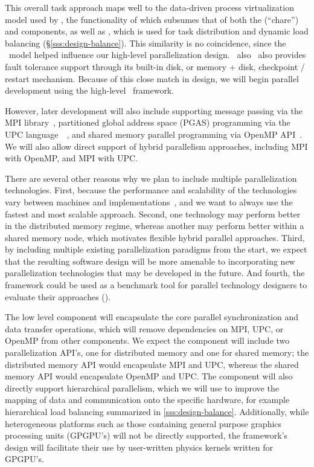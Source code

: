 \documentclass[10pt,twocolumn]{article}
\begin{document}
This overall task approach maps well to the data-driven process
virtualization model used by \charm, the functionality of which
subsumes that of both the  (``chare'') and 
components, as well as , which is used for task
distribution and dynamic load balancing (\S\ref{sss:design-balance}).  This
similarity is no coincidence, since the \charm\ model helped influence
our high-level parallelization design.  \charm\ also \charm\ also
provides fault tolerance support through its built-in disk, or memory
+ disk, checkpoint / restart mechanism.  Because of this close match
in design, we will begin parallel development using the high-level
\charm\ framework.

However, later development will also include supporting message
passing via the MPI library~\cite{wwwmpi}, partitioned global address
space (PGAS) programming via the UPC
language~\cite{wwwupc}~\cite{upc}, and shared memory parallel
programming via OpenMP API~\cite{wwwopenmp}.  We will also allow
direct support of hybrid parallelism approaches, including MPI with
OpenMP, and MPI with UPC.

There are several other reasons why we plan to include multiple
parallelization technologies.  First, because the performance and
scalability of the technologies vary between machines and
implementations~\cite{MaTa09}, and we want to always use the fastest
and most scalable approach.  Second, one technology may perform better
in the distributed memory regime, whereas another may perform better
within a shared memory node, which motivates flexible hybrid parallel
approaches.  Third, by including multiple existing parallelization
paradigms from the start, we expect that the resulting software design
will be more amenable to incorporating new parallelization
technologies that may be developed in the future.  And fourth, the
framework could be used as a benchmark tool for parallel technology
designers to evaluate their approaches (\cite{WeSu07}).

The low level  component will encapsulate the core
parallel synchronization and data transfer operations, which will
remove dependencies on MPI, UPC, or OpenMP from other components.  We
expect the  component will include two parallelization
API's, one for distributed memory and one for shared memory; the
distributed memory API would encapsulate MPI and UPC, whereas the
shared memory API would encapsulate OpenMP and UPC.  The
 component will also directly support hierarchical
parallelism, which we will use to improve the mapping of data and
communication onto the specific hardware, for example hierarchical
load balancing summarized in \ref{sss:design-balance}.  Additionally,
while heterogeneous platforms such as those containing general purpose
graphics processing units (GPGPU's) will not be directly supported,
the framework's design will facilitate their use by user-written
physics kernels written for GPGPU's.
\end{document}
